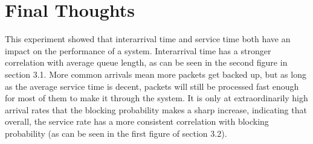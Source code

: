 \documentclass[11pt]{article} %
\begin{document}
\section{Final Thoughts}

This experiment showed that interarrival time and service time both have an impact on the performance of a system. Interarrival time has a stronger correlation with average queue length, as can be seen in the second figure in section 3.1. More common arrivals mean more packets get backed up, but as long as the average service time is decent, packets will still be processed fast enough for most of them to make it through the system. It is only at extraordinarily high arrival rates that the blocking probability makes a sharp increase, indicating that overall, the service rate has a more consistent correlation with blocking probability (as can be seen in the first figure of section 3.2).
\end{document}
